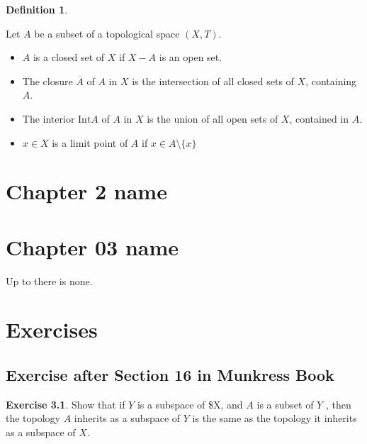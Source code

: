 \documentclass[
]{book}
\providecommand{\tightlist}{%
  \setlength{\itemsep}{0pt}\setlength{\parskip}{0pt}}
\theoremstyle{definition}
\newtheorem{definition}{Definition}[chapter]
\theoremstyle{definition}
\theoremstyle{definition}
\newtheorem{exercise}{Exercise}[chapter]
\theoremstyle{definition}
\theoremstyle{remark}
\begin{document}
\begin{definition}
\protect\hypertarget{def:unnamed-chunk-49}{}\label{def:unnamed-chunk-49}

Let \(A\) be a subset of a topological space \((X, T)\).

\begin{itemize}
\tightlist
\item
  \(A\) is a closed set of \(X\) if \(X - A\) is an open set.
\item
  The closure \(\overline{A}\) of \(A\) in \(X\) is the intersection of all closed sets of \(X\), containing \(A\).
\item
  The interior \(\text{Int}A\) of \(A\) in \(X\) is the union of all open sets of \(X\), contained in \(A\).
\item
  \(x \in X\) is a limit point of \(A\) if \(x \in A\setminus\{x\}\)
\end{itemize}

\end{definition}

\hypertarget{chapter-2-name}{%
\chapter{Chapter 2 name}\label{chapter-2-name}}

\hypertarget{chapter-03-name}{%
\chapter{Chapter 03 name}\label{chapter-03-name}}

Up to there is none.

\hypertarget{exercises}{%
\chapter{Exercises}\label{exercises}}

\hypertarget{exercise-after-section-16-in-munkress-book}{%
\section{Exercise after Section 16 in Munkress Book}\label{exercise-after-section-16-in-munkress-book}}

\begin{exercise}
\protect\hypertarget{exr:unnamed-chunk-50}{}\label{exr:unnamed-chunk-50}Show that if \(Y\) is a subspace of \$X, and \(A\) is a subset of \(Y\) , then the topology \(A\) inherits as a subspace of \(Y\) is the same as the topology it inherits as a subspace of \(X\).
\end{exercise}
\end{document}
